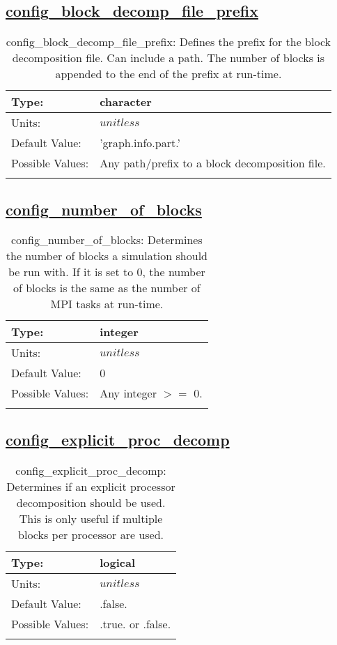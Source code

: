 \subsection[config\_block\_decomp\_file\_prefix]{\hyperref[sec:nm_tab_decomposition]{config\_block\_decomp\_file\_prefix}}
\label{subsec:nm_sec_config_block_decomp_file_prefix}
\begin{center}
\begin{longtable}{| p{2.0in} | p{4.0in} |}
    \hline
    Type: & character \\
    \hline
    Units: & $unitless$ \\
    \hline
    Default Value: & 'graph.info.part.' \\
    \hline
    Possible Values: & Any path/prefix to a block decomposition file. \\
    \hline
    \caption{config\_block\_decomp\_file\_prefix: Defines the prefix for the block decomposition file. Can include a path. The number of blocks is appended to the end of the prefix at run-time.}
\end{longtable}
\end{center}
\subsection[config\_number\_of\_blocks]{\hyperref[sec:nm_tab_decomposition]{config\_number\_of\_blocks}}
\label{subsec:nm_sec_config_number_of_blocks}
\begin{center}
\begin{longtable}{| p{2.0in} | p{4.0in} |}
    \hline
    Type: & integer \\
    \hline
    Units: & $unitless$ \\
    \hline
    Default Value: & 0 \\
    \hline
    Possible Values: & Any integer $>=$ 0. \\
    \hline
    \caption{config\_number\_of\_blocks: Determines the number of blocks a simulation should be run with. If it is set to 0, the number of blocks is the same as the number of MPI tasks at run-time.}
\end{longtable}
\end{center}
\subsection[config\_explicit\_proc\_decomp]{\hyperref[sec:nm_tab_decomposition]{config\_explicit\_proc\_decomp}}
\label{subsec:nm_sec_config_explicit_proc_decomp}
\begin{center}
\begin{longtable}{| p{2.0in} | p{4.0in} |}
    \hline
    Type: & logical \\
    \hline
    Units: & $unitless$ \\
    \hline
    Default Value: & .false. \\
    \hline
    Possible Values: & .true. or .false. \\
    \hline
    \caption{config\_explicit\_proc\_decomp: Determines if an explicit processor decomposition should be used. This is only useful if multiple blocks per processor are used.}
\end{longtable}
\end{center}
